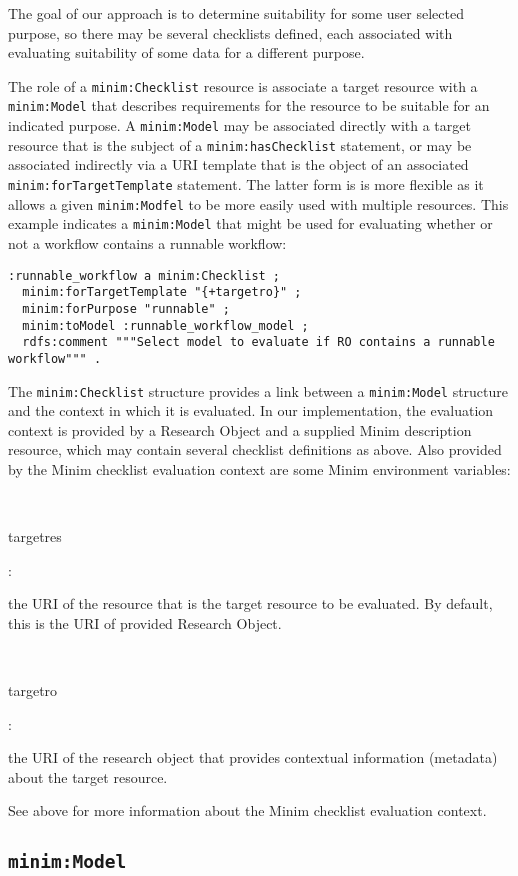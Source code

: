 \documentclass[]{article}
\begin{document}
The goal of our approach is to determine suitability for some user
selected purpose, so there may be several checklists defined, each
associated with evaluating suitability of some data for a different
purpose.

The role of a \texttt{minim:Checklist} resource is associate a target
resource with a \texttt{minim:Model} that describes requirements for the
resource to be suitable for an indicated purpose. A \texttt{minim:Model}
may be associated directly with a target resource that is the subject of
a \texttt{minim:hasChecklist} statement, or may be associated indirectly
via a URI template that is the object of an associated
\texttt{minim:forTargetTemplate} statement. The latter form is is more
flexible as it allows a given \texttt{minim:Modfel} to be more easily
used with multiple resources. This example indicates a
\texttt{minim:Model} that might be used for evaluating whether or not a
workflow contains a runnable workflow:

\begin{verbatim}
:runnable_workflow a minim:Checklist ;
  minim:forTargetTemplate "{+targetro}" ;
  minim:forPurpose "runnable" ;
  minim:toModel :runnable_workflow_model ;
  rdfs:comment """Select model to evaluate if RO contains a runnable workflow""" .
\end{verbatim}

The \texttt{minim:Checklist} structure provides a link between a
\texttt{minim:Model} structure and the context in which it is evaluated.
In our implementation, the evaluation context is provided by a Research
Object and a supplied Minim description resource, which may contain
several checklist definitions as above. Also provided by the Minim
checklist evaluation context are some Minim environment variables:

~~

targetres

:

the URI of the resource that is the target resource to be evaluated. By
default, this is the URI of provided Research Object.

~~

targetro

:

the URI of the research object that provides contextual information
(metadata) about the target resource.

See above for more information about the Minim checklist evaluation
context.

\subsection{\texttt{minim:Model}}
\end{document}
